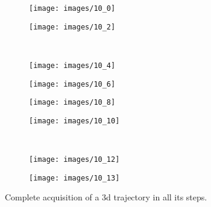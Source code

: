 \begin{figure}
    \centering
    \begin{subfigure}[b]{0.45\textwidth}
        \centering
        \texttt{[image: images/10\_0]}
        \caption[]{}
        \label{fig:trajA}
    \end{subfigure}
    \hfill
    \begin{subfigure}[b]{0.45\textwidth}
        \centering
        \texttt{[image: images/10\_2]}
        \caption[]{}
        \label{fig:trajB}
    \end{subfigure}
    \\[\smallskipamount]
    \begin{subfigure}[b]{0.45\textwidth}
        \centering
        \texttt{[image: images/10\_4]}
        \caption[]{}
        \label{fig:trajC}
    \end{subfigure}
    \hfill
    \begin{subfigure}[b]{0.45\textwidth}
        \centering
        \texttt{[image: images/10\_6]}
        \caption[]{}
        \label{fig:trajD}
    \end{subfigure}
        \begin{subfigure}[b]{0.45\textwidth}
        \centering
        \texttt{[image: images/10\_8]}
        \caption[]{}
        \label{fig:trajE}
    \end{subfigure}
    \hfill
    \begin{subfigure}[b]{0.45\textwidth}
        \centering
        \texttt{[image: images/10\_10]}
        \caption[]{}
        \label{fig:trajF}
    \end{subfigure}
    \\[\smallskipamount]
    \begin{subfigure}[b]{0.45\textwidth}
        \centering
        \texttt{[image: images/10\_12]}
        \caption[]{}
        \label{fig:trajG}
    \end{subfigure}
    \hfill
    \begin{subfigure}[b]{0.45\textwidth}
        \centering
        \texttt{[image: images/10\_13]}
        \caption[]{}
        \label{fig:trajH}
    \end{subfigure}
    \caption[Complete acquisition of a 3d trajectory in all its steps.]{Complete acquisition of a 3d trajectory in all its steps.}
    \label{fig:trajstep}
\end{figure}

